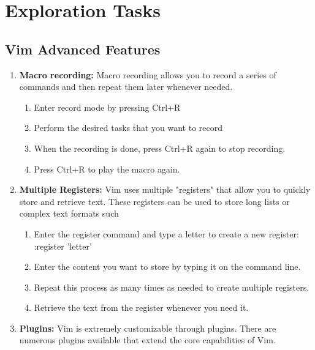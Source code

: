\documentclass[titlepage]{article}
\begin{document}
\section{Exploration Tasks}
\subsection{Vim Advanced Features}
\begin{enumerate}
    \item \textbf{Macro recording:} Macro recording allows you to record a series of commands and then repeat them later whenever needed.
        \begin{enumerate}
            \item Enter record mode by pressing Ctrl+R
            \item Perform the desired tasks that you want to record
            \item When the recording is done, press Ctrl+R again to stop recording.
            \item Press Ctrl+R to play the macro again.
        \end{enumerate}

    \item \textbf{Multiple Registers:} Vim uses multiple "registers" that allow you to quickly store and retrieve text. These registers can be used to store long lists or complex text formats such 
        \begin{enumerate}
            \item Enter the register command and type a letter to create a new register:\\
            :register 'letter'
            \item Enter the content you want to store by typing it on the command line.
            \item Repeat this process as many times as needed to create multiple registers.
            \item Retrieve the text from the register whenever you need it.
        \end{enumerate}

    \item \textbf{Plugins:} Vim is extremely customizable through plugins. There are numerous plugins available that extend the core capabilities of Vim.
\end{enumerate}
\end{document}
